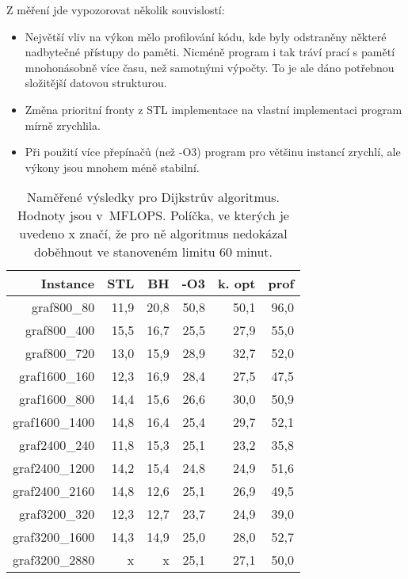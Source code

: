\documentclass[a4paper,11pt]{article}
\begin{document}
Z měření jde vypozorovat několik souvislostí:
\begin{itemize}
 \item Největší vliv na výkon mělo profilování kódu, kde byly odstraněny některé nadbytečné přístupy do paměti. Nicméně program i tak tráví prací s pamětí mnohonásobně více času, než samotnými výpočty. To je ale dáno potřebnou složitější datovou strukturou.
 \item Změna prioritní fronty z STL implementace na vlastní implementaci program mírně zrychlila.
 \item Při použití více přepínačů (než -O3) program pro většinu instancí zrychlí, ale výkony jsou mnohem méně stabilní.
\end{itemize}
\begin{table}[H]
  \begin{center}
      \begin{tabular}{|r|r|r|r|r|r|}
      \hline
      Instance  	& STL	  & BH    & -O3	 & k. opt  & prof  \\ \hline
      graf800\_80  	& 11,9  & 20,8	  & 50,8 & 50,1    & 96,0  \\ \hline
      graf800\_400     	& 15,5  & 16,7 	  & 25,5 & 27,9	   & 55,0  \\ \hline
      graf800\_720  	& 13,0  & 15,9 	  & 28,9 & 32,7	   & 52,0  \\ \hline
      graf1600\_160    	& 12,3  & 16,9 	  & 28,4 & 27,5	   & 47,5  \\ \hline
      graf1600\_800  	& 14,4  & 15,6 	  & 26,6 & 30,0	   & 50,9  \\ \hline
      graf1600\_1400   	& 14,8  & 16,4 	  & 25,4 & 29,7	   & 52,1  \\ \hline
      graf2400\_240  	& 11,8  & 15,3	  & 25,1 & 23,2    & 35,8  \\ \hline
      graf2400\_1200   	& 14,2  & 15,4	  & 24,8 & 24,9    & 51,6  \\ \hline
      graf2400\_2160  	& 14,8  & 12,6	  & 25,1 & 26,9    & 49,5  \\ \hline
      graf3200\_320    	& 12,3  & 12,7	  & 23,7 & 24,9    & 39,0  \\ \hline
      graf3200\_1600  	& 14,3  & 14,9	  & 25,0 & 28,0    & 52,7  \\ \hline
      graf3200\_2880   	& x    	& x 	  & 25,1 & 27,1    & 50,0  \\ \hline
      \end{tabular}
  \caption{Naměřené výsledky pro Dijkstrův algoritmus. Hodnoty jsou v~MFLOPS. Políčka, ve kterých je uvedeno x značí, že pro ně algoritmus nedokázal doběhnout ve stanoveném limitu 60 minut.}
  \label{tab:dijkstra1}
  \end{center}
\end{table}
\end{document}

